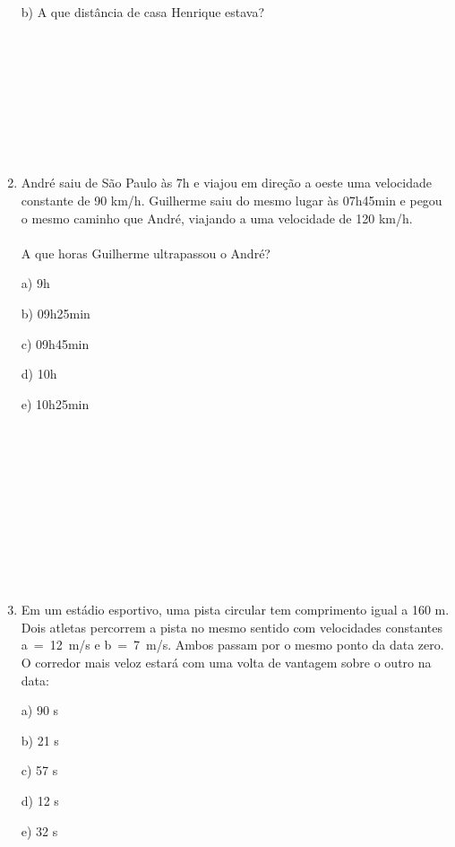 \documentclass[a4paper,14pt]{article}
\begin{document}
\begin{multicols}{2}
\begin{enumerate}
    		b) A que distância de casa Henrique estava? \\\\\\\\\\\\\\\\\\
    		
    		\item André saiu de São Paulo às 7h e viajou em direção a oeste uma velocidade constante de 90 km/h. Guilherme saiu do mesmo lugar às 07h45min e pegou o mesmo caminho que André, viajando a uma velocidade de 120 km/h. \\\\A que horas Guilherme ultrapassou o André? 
    		
    		a) 9h
    		
    		b) 09h25min
    		
    		c) 09h45min
    		
    		d) 10h
    		
    		e) 10h25min\\\\\\\\\\\\\\\\\\\\\\
    		
    		\item Em um estádio esportivo, uma pista circular tem comprimento igual a 160 m. Dois atletas percorrem a pista no mesmo sentido com velocidades constantes a~=~12~m/s e b~=~7~m/s. Ambos passam por o mesmo ponto da data zero. O corredor mais veloz estará com uma volta de vantagem sobre o outro na data: 
    		
    		a) 90 s
    		
    		b) 21 s
    		
    		c) 57 s
    		
    		d) 12 s
    		
    		e) 32 s\\\\\\\\
    		

\end{enumerate}
\end{multicols}
\end{document}
